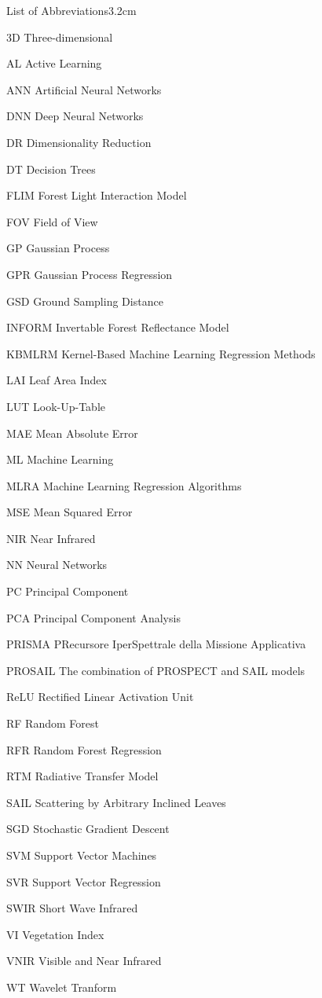 \begin{mclistof}{List of Abbreviations}{3.2cm}

\item[3D] Three-dimensional
\item[AL] Active Learning
\item[ANN] Artificial Neural Networks
\item[DNN] Deep Neural Networks
\item[DR] Dimensionality Reduction
\item[DT] Decision Trees
\item[FLIM] Forest Light Interaction Model
\item[FOV] Field of View
\item[GP] Gaussian Process
\item[GPR] Gaussian Process Regression
\item[GSD] Ground Sampling Distance
\item[INFORM] Invertable Forest Reflectance Model
\item[KBMLRM] Kernel-Based Machine Learning Regression Methods
\item[LAI] Leaf Area Index
\item[LUT] Look-Up-Table
\item[MAE] Mean Absolute Error
\item[ML] Machine Learning
\item[MLRA] Machine Learning Regression Algorithms
\item[MSE] Mean Squared Error
\item[NIR] Near Infrared
\item[NN] Neural Networks
\item[PC] Principal Component
\item[PCA] Principal Component Analysis
\item[PRISMA] PRecursore IperSpettrale della Missione Applicativa
\item[PROSAIL] The combination of PROSPECT and SAIL models
\item[ReLU] Rectified Linear Activation Unit
\item[RF] Random Forest
\item[RFR] Random Forest Regression
\item[RTM] Radiative Transfer Model
\item[SAIL] Scattering by Arbitrary Inclined Leaves
\item[SGD] Stochastic Gradient Descent
\item[SVM] Support Vector Machines
\item[SVR] Support Vector Regression
\item[SWIR] Short Wave Infrared
\item[VI] Vegetation Index
\item[VNIR] Visible and Near Infrared
\item[WT] Wavelet Tranform

\end{mclistof} 
